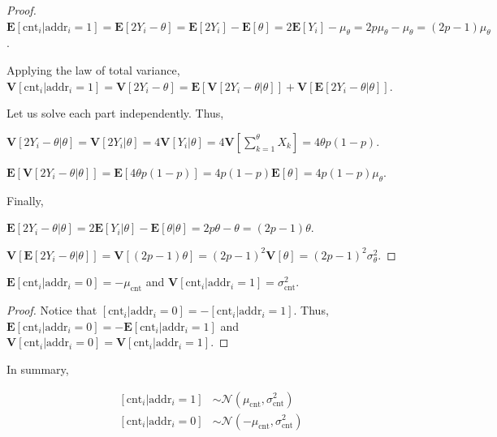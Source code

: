 \begin{proof}

$\mathbf{E}[\text{cnt}_i | \text{addr}_i = 1] = \mathbf{E}[2Y_i - \theta] = \mathbf{E}[2Y_i] - \mathbf{E}[\theta] = 2 \mathbf{E}[Y_i] - \mu_\theta = 2 p \mu_\theta - \mu_\theta = (2p-1) \mu_\theta$.

Applying the law of total variance, $\mathbf{V}[\text{cnt}_i | \text{addr}_i = 1] = \mathbf{V}[2Y_i - \theta] = \mathbf{E}[\mathbf{V}[2Y_i - \theta | \theta]] + \mathbf{V}[\mathbf{E}[2Y_i - \theta | \theta]]$.

Let us solve each part independently. Thus,

$\mathbf{V}[2Y_i - \theta | \theta] = \mathbf{V}[2Y_i | \theta] = 4 \mathbf{V}[Y_i | \theta] = 4 \mathbf{V}[\sum_{k=1}^\theta X_k] = 4 \theta p (1-p)$.

$\mathbf{E}[\mathbf{V}[2Y_i - \theta | \theta]] = \mathbf{E}[4 \theta p (1-p)] = 4p(1-p) \mathbf{E}[\theta] = 4p(1-p) \mu_\theta$.

Finally,

$\mathbf{E}[2Y_i - \theta | \theta] = 2 \mathbf{E}[Y_i | \theta] - \mathbf{E}[\theta | \theta] = 2p \theta - \theta = (2p-1) \theta$.

$\mathbf{V}[\mathbf{E}[2Y_i - \theta | \theta]] = \mathbf{V}[(2p-1) \theta] = (2p-1)^2 \mathbf{V}[\theta] = (2p-1)^2 \sigma^2_\theta$.
\end{proof}

\begin{theorem}
$\mathbf{E}[\text{cnt}_i | \text{addr}_i = 0] = - \mu_{\text{cnt}}$ and $\mathbf{V}[\text{cnt}_i | \text{addr}_i = 1] = \sigma^2_\text{cnt}$.
\end{theorem}
\begin{proof}
Notice that $[\text{cnt}_i | \text{addr}_i = 0] = -[\text{cnt}_i | \text{addr}_i = 1]$. Thus, $\mathbf{E}[\text{cnt}_i | \text{addr}_i = 0] = -\mathbf{E}[\text{cnt}_i | \text{addr}_i = 1]$ and $\mathbf{V}[\text{cnt}_i | \text{addr}_i = 0] = \mathbf{V}[\text{cnt}_i | \text{addr}_i = 1]$.
\end{proof}

In summary,

\begin{align}
\left[ \text{cnt}_i | \text{addr}_i=1 \right] &\sim \mathcal{N}(\mu_\text{cnt}, \sigma^2_\text{cnt})\label{cntaddr1} \\
\left[ \text{cnt}_i | \text{addr}_i=0 \right] &\sim \mathcal{N}(-\mu_\text{cnt}, \sigma^2_\text{cnt})\label{cntaddr0}
\end{align}

